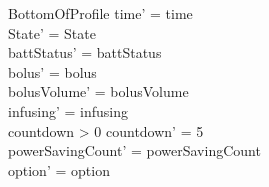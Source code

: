 \begin{schema}{BottomOfProfile}
	time' = time\\ State' = State\\
	battStatus' = battStatus\\
	bolus' = bolus\\
	bolusVolume' = bolusVolume\\
	infusing' = infusing\\
	countdown > 0 \land countdown' = 5\\
	powerSavingCount' = powerSavingCount\\ option' = option\\
\end{schema}

